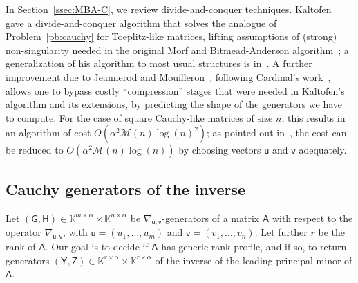 \documentclass{sig-alternate}
\newcommand{\vu}{\ensuremath{\mathsf{u}}}
\newcommand{\vv}{\ensuremath{\mathsf{v}}}
\newcommand{\mA}{\ensuremath{\mathsf{A}}}
\newcommand{\mG}{\ensuremath{\mathsf{G}}}
\newcommand{\mH}{\ensuremath{\mathsf{H}}}
\newcommand{\mY}{\ensuremath{\mathsf{Y}}}
\newcommand{\mZ}{\ensuremath{\mathsf{Z}}}
\newcommand{\K}{\ensuremath{\mathbb{K}}}
\newcommand{\M}{\ensuremath{\mathscr{M}}}
\begin{document}
In Section~\ref{ssec:MBA-C}, we review divide-and-conquer
techniques. Kaltofen~\cite{Kaltofen94} gave a divide-and-conquer
algorithm that solves the analogue of Problem~\ref{pb:cauchy} for
Toeplitz-like matrices, lifting assumptions of (strong)
non-singularity needed in the original Morf and Bitmead-Anderson
algorithm~\cite{Morf80,BiAn80}; a generalization of his algorithm to
most usual structures is in~\cite{Pan01}.  A further improvement due
to Jeannerod and Mouilleron~\cite{JeMo10}, following Cardinal's
work~\cite{Cardinal99}, allows one to bypass costly ``compression''
stages that were needed in Kaltofen's algorithm and its extensions, by
predicting the shape of the generators we have to compute. For the
case of square Cauchy-like matrices of size $n$, this results in an
algorithm of cost $O(\alpha^2 \M(n)\log(n)^2)$; as pointed out
in~\cite{xxx}, the cost can be reduced to $O(\alpha^2 \M(n)\log(n))$
by choosing vectors $\vu$ and $\vv$ adequately.



\subsection{Cauchy generators of the inverse}\label{ssec:genofinv}

Let $(\mG,\mH) \in \K^{m\times \alpha} \times \K^{n\times \alpha}$ be
$\nabla_{\vu,\vv}$-generators of a matrix $\mA$ with respect to the
operator $\nabla_{\vu,\vv}$, with $\vu=(u_1,\dots,u_m)$ and
$\vv=(v_1,\dots,v_n)$. Let further $r$ be the rank of $\mA$. Our goal
is to decide if $\mA$ has generic rank profile, and if so, to return
generators $(\mY,\mZ) \in \K^{r\times \alpha} \times \K^{r\times
  \alpha}$ of the inverse of the leading principal minor of $\mA$.
\end{document}
